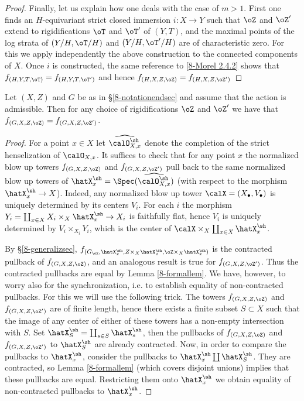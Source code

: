 \documentclass[10pt]{../fichiers-configuration-latex/smfart}
\begin{document}
\begin{proof}
Finally, let us explain how one deals with the case of $m>1$. First
one finds an $H$-equivariant strict closed immersion $i:X\to Y$
such that $\oZ$ and $\oZ'$ extend to rigidifications $\oT$ and
$\oT'$ of $(Y,T)$, and the maximal points of the log strata of
$(Y/H,\oT/H)$ and $(Y/H,\oT'/H)$ are of characteristic zero. For
this we apply independently the above construction to the connected
components of $X$. Once $i$ is constructed, the same reference to
\ref{8-Morel 2.4.2} shows that $f_{(H,Y,T,\oT)}=f_{(H,Y,T,\oT')}$
and hence $f_{(H,X,Z,\oZ)}=f_{(H,X,Z,\oZ')}$ \end{proof}

\begin{corollary2}\label{8-indepprop} Let $(X,Z)$ and $G$
be as in \S\ref{8-notationendsec} and assume that the action
is admissible. Then for any choice of rigidifications $\oZ$
and $\oZ'$ we have that $f_{(G,X,Z,\oZ)}=f_{(G,X,Z,\oZ')}$.
\end{corollary2} \begin{proof} For a point $x\in X$ let
$\widehat{\calO^\sh_{X,x}}$ denote the completion of the strict
henselization of $\calO_{X,x}$. It suffices to check that for
any point $x$ the normalized blow up towers $f_{(G,X,Z,\oZ)}$
and $f_{(G,X,Z,\oZ')}$ pull back to the same normalized blow up
towers of $\hatX^\sh_x=\Spec(\widehat{\calO^\sh_{X,x}})$ (with
respect to the morphism $\hatX^\sh_x\to X$). Indeed, any normalized
blow up tower $\calX=(X_\bullet,V_\bullet)$ is uniquely determined by
its centers $V_i$. For each $i$ the morphism $Y_i=\coprod_{x\in
X}X_i\times_X\hatX^\sh_x\to X_i$ is faithfully flat, hence $V_i$
is uniquely determined by $V_i\times_{X_i}Y_i$, which is the center
of $\calX\times_X\coprod_{x\in X}\hatX^\sh_x$.

By \S\ref{8-generalizsec},
$f_{(G_\ox,\hatX^\sh_x,Z\times_X\hatX^\sh_x,\oZ\times_X\hatX^\sh_x)}$
is the contracted pullback of $f_{(G,X,Z,\oZ)}$, and an analogous
result is true for $f_{(G,X,Z,\oZ')}$. Thus the contracted
pullbacks are equal by Lemma \ref{8-formallem}. We have, however,
to worry also for the synchronization, i.e. to establish equality
of non-contracted pullbacks. For this we will use the following
trick. The towers $f_{(G,X,Z,\oZ)}$ and $f_{(G,X,Z,\oZ')}$ are
of finite length, hence there exists a finite subset $S\subset X$
such that the image of any center of either of these towers has a
non-empty intersection with $S$. Set $\hatX^\sh_S=\coprod_{s\in
S}\hatX^\sh_s$, then the pullbacks of $f_{(G,X,Z,\oZ)}$ and
$f_{(G,X,Z,\oZ')}$ to $\hatX^\sh_S$ are already contracted. Now,
in order to compare the pullbacks to $\hatX^\sh_x$, consider the
pullbacks to $\hatX^\sh_x\coprod\hatX^\sh_S$. They are contracted,
so Lemma \ref{8-formallem} (which covers disjoint unions) implies
that these pullbacks are equal. Restricting them onto $\hatX^\sh_x$
we obtain equality of non-contracted pullbacks to $\hatX^\sh_x$.
\end{proof}
\end{document}
